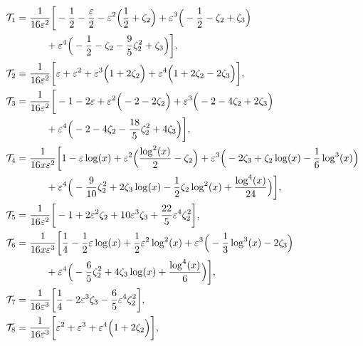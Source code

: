 \documentclass[final,1p,times]{elsarticle}
\begin{document}
\begingroup
\allowdisplaybreaks
\begin{align}
% 
\mi_1 &=   \frac{1}{16 \ep^2}  \bigg[
% 
-\frac{1}{2}
-\frac{\ep}{2}
-\ep^2 \Big(
         \frac{1}{2}
        +\zeta_2
\Big)
+\ep^3 \Big(
        -\frac{1}{2}
        -\zeta_2
        +\zeta_3
\Big)
\nonumber\\& \qquad \quad
+\ep^4 \Big(
        -\frac{1}{2}
        -\zeta_2
        -\frac{9}{5} \zeta_2^2
        +\zeta_3
\Big)
% 
\bigg],
\nonumber\\
%
\mi_2 &=   \frac{1}{16 \ep^2}  \bigg[
% 
\ep
+\ep^2
+\ep^3 \Big(
        1
        +2 \zeta_2
\Big)
+\ep^4 \Big(
        1
        +2 \zeta_2
        -2 \zeta_3
\Big)
% 
\bigg],
% 
\nonumber\\
% 
\mi_3 &=   \frac{1}{16 \ep^2}  \bigg[
% 
-1
-2 \ep
+\ep^2 \Big(
        -2
        -2 \zeta_2
\Big)
+\ep^3 \Big(
        -2
        -4 \zeta_2
        +2 \zeta_3
\Big)
\nonumber\\& \qquad \quad
+\ep^4 \Big(
        -2
        -4 \zeta_2
        -\frac{18}{5} \zeta_2^2
        +4 \zeta_3
\Big)
% 
\bigg],
% 
\nonumber\\
% 
\mi_4 &=   \frac{1}{16 x \ep^2}  \bigg[
% 
1
-\ep \log (x)
+\ep^2 \Big(
        \frac{\log ^2(x)}{2}
        -\zeta_2
\Big)
+\ep^3 \Big(
        -2 \zeta_3
        +\zeta_2 \log (x)
        -\frac{1}{6} \log ^3(x)
\Big)
\nonumber\\& \qquad \quad
+\ep^4 \Big(
        -\frac{9}{10} \zeta_2^2
        +2 \zeta_3 \log (x)
        -\frac{1}{2} \zeta_2 \log ^2(x)
        +\frac{\log ^4(x)}{24}
\Big)
% 
\bigg],
% 
\nonumber\\
%
\mi_5 &=   \frac{1}{16 \ep^2}  \bigg[
% 
-1
+2 \ep^2 \zeta_2
+10 \ep^3 \zeta_3
+\frac{22}{5} \ep^4 \zeta_2^2
% 
\bigg],
% 
\nonumber\\
% 
\mi_6 &=   \frac{1}{16 x \ep^3}  \bigg[
% 
\frac{1}{4}
-\frac{1}{2} \ep \log (x)
+\frac{1}{2} \ep^2 \log ^2(x)
+\ep^3 \Big(
        -\frac{1}{3} \log ^3(x)
        -2 \zeta_3
\Big)
\nonumber\\& \qquad \quad
+\ep^4 \Big(
        -\frac{6}{5} \zeta_2^2
        +4 \zeta_3 \log (x)
        +\frac{\log ^4(x)}{6}
\Big)
% 
\bigg],
% 
\nonumber\\
% 
\mi_7 &=   \frac{1}{16 \ep^3}  \bigg[
% 
\frac{1}{4}
-2 \ep^3 \zeta_3
-\frac{6}{5} \ep^4 \zeta_2^2
% 
\bigg],
% 
\nonumber\\
% 
\mi_8 &=   \frac{1}{16 \ep^3}  \bigg[
% 
\ep^2
+\ep^3
+\ep^4 \Big(
        1
        +2 \zeta_2
\Big)
% 
\bigg],
% 
\nonumber\\

\end{align}
\end{document}
